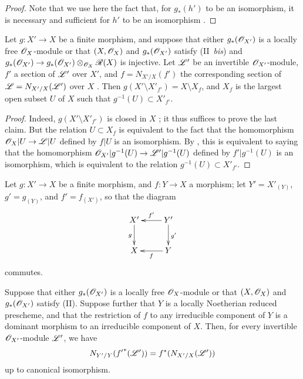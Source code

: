 \begin{proof}
Note that we use here the fact that, for $g_*(h')$ to be an isomorphism, it is necessary and sufficient for $h'$ to be an isomorphism .
\end{proof}

\begin{corollary}[6.5.7]
\label{II.6.5.7}
Let $g:X'\to X$ be a finite morphism, and suppose that either $g_*(\mathscr{O}_{X'})$ is a locally free $\mathscr{O}_X$-module or that $(X,\mathscr{O}_X)$ and $g_*(\mathscr{O}_{X'})$ satisfy (II~\emph{bis}) and $g_*(\sh{O}_{X'})\to g_*(\sh{O}_{X'})\otimes_{\sh{O}_X}\sh{R}(X)$ is injective.
Let $\mathscr{L}'$ be an invertible $\mathscr{O}_{X'}$-module, $f'$ a section of $\mathscr{L}'$ over $X'$, and $f=N_{X'/X}(f')$ the corresponding section of $\mathscr{L}=N_{X'/X}(\mathscr{L}')$ over $X$ .
Then $g(X'\setminus X'_{f'})=X\setminus X_f$, and $X_f$ is the largest open subset $U$ of $X$ such that $g^{-1}(U)\subset X'_{f'}$.
\end{corollary}

\begin{proof}
Indeed, $g(X'\setminus X'_{f'})$ is closed in $X$ ;
it thus suffices to prove the last claim.
But the relation $U\subset X_f$ is equivalent to the fact that the homomorphism $\sh{O}_X|U\to\sh{L}|U$ defined by $f|U$ is an isomorphism.
By , this is equivalent to saying that the homomorphism $\sh{O}_{X'}|g^{-1}(U)\to\sh{L}'|g^{-1}(U)$ defined by $f'|g^{-1}(U)$ is an isomorphism, which is equivalent to the relation $g^{-1}(U)\subset X'_{f'}$.
\end{proof}

\begin{proposition}[6.5.8]
\label{II.6.5.8}
Let $g:X'\to X$ be a finite morphism, and $f:Y\to X$ a morphism;
let $Y'=X'_{(Y)}$, $g'=g_{(Y)}$, and $f'=f_{(X')}$, so that the diagram
\[
  \xymatrix{
    X' \ar[d]_{g}
    & Y' \ar[l]_{f'} \ar[d]^{g'}
  \\X
    & Y \ar[l]^{f}
  }
\]
commutes.

Suppose that either $g_*(\mathscr{O}_{X'})$ is a locally free $\mathscr{O}_X$-module or that $(X,\mathscr{O}_X)$ and $g_*(\mathscr{O}_{X'})$ satisfy (II).
Suppose further that $Y$ is a locally Noetherian reduced prescheme, and that the restriction of $f$ to any irreducible component of $Y$ is a dominant morphism to an irreducible component of $X$.
Then, for every invertible $\mathscr{O}_{X'}$-module $\mathscr{L}'$, we have
\[
  N_{Y'/Y}({f'}^*(\mathscr{L}')) = f^*(N_{X'/X}(\mathscr{L}'))
\]
up to canonical isomorphism.
\end{proposition}

